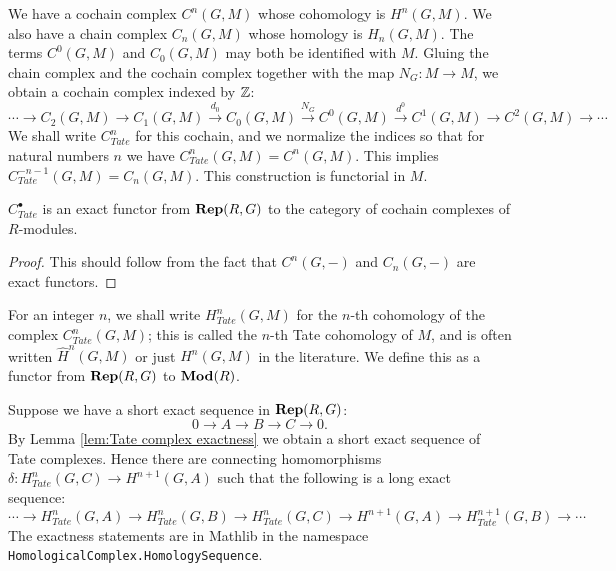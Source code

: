 \begin{definition} \label{def:Tate complex}
	\leanok
	We have a cochain complex $C^n(G,M)$ whose cohomology is $H^n(G,M)$.
	We also have a chain complex $C_n(G,M)$ whose homology is $H_n(G,M)$.
	The terms $C^0(G,M)$ and $C_0(G,M)$ may both be identified with $M$.
	Gluing the chain complex and the cochain complex together with the map $N_G : M \to M$, we obtain
	a cochain complex indexed by ${\mathbb Z}$:
	\[
		\cdots \to C_2(G,M) \to C_1(G,M) \stackrel{d_0}\to C_0(G,M)
		\stackrel{N_G}\to C^0(G,M) \stackrel{d^0}\to C^1(G,M) \to C^2(G,M) \to \cdots
	\]
	We shall write $C^n_{Tate}$ for this cochain, and we normalize the indices so that for
	natural numbers $n$ we have $C^n_{Tate}(G,M) = C^n(G,M)$. This implies
	$C^{-n-1}_{Tate}(G,M) = C_n(G,M)$.
	This construction is functorial in $M$.
\end{definition}

\begin{lemma}	\label{lem:Tate complex exactness}
	\leanok
  $C^\bullet_{Tate}$ is an exact functor from $\mathbf{Rep}(R,G)$ to the category
  of cochain complexes of $R$-modules.
\end{lemma}

\begin{proof}
	This should follow from the fact that $C^n(G,-)$ and $C_n(G,-)$ are exact functors.
\end{proof}

\begin{definition} \label{def:Tate cohomology}
	For an integer $n$, we shall write $H^n_{Tate}(G,M)$ for the $n$-th cohomology of the complex
	$C^n_{Tate}(G,M)$; this is called the $n$-th Tate cohomology of $M$,
	and is often written $\hat H^n(G,M)$ or just $H^n(G,M)$ in the literature.
	We define this as a functor from $\mathbf{Rep}(R,G)$ to $\mathbf{Mod}(R)$.
\end{definition}

\begin{definition} \label{def:Tate long exact sequence}
	\leanok
	Suppose we have a short exact sequence in $\mathbf{Rep}(R,G)$:
	\[
		0 \to A \to B \to C \to 0.
	\]
	By Lemma \ref{lem:Tate complex exactness} we obtain a short exact sequence of Tate complexes.
	Hence there are connecting homomorphisms $\delta : H^n_{Tate}(G,C) \to H^{n+1}(G,A)$
	such that the following is a long exact sequence:
	\[
		\cdots \to H^n_{Tate}(G,A) \to H^n_{Tate}(G,B) \to H^n_{Tate}(G,C)
		\to H^{n+1}(G,A) \to H^{n+1}_{Tate}(G,B) \to \cdots
	\]
	The exactness statements are in Mathlib in the namespace
	\texttt{HomologicalComplex.HomologySequence}.
\end{definition}


